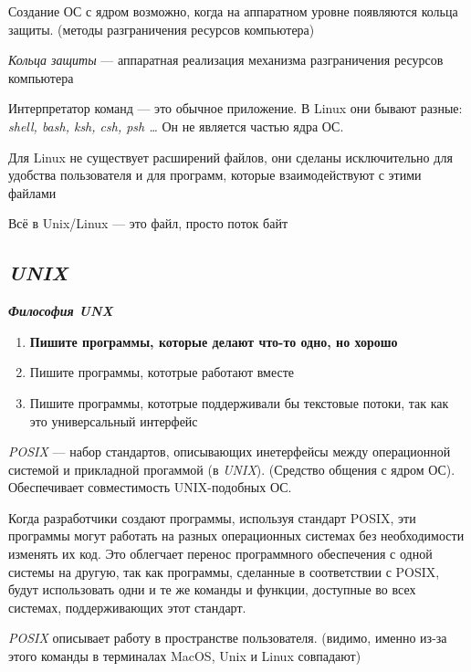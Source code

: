\documentclass[oneside, final, 14pt]{extreport} %
\begin{document}
Создание ОС с ядром возможно, когда на аппаратном уровне появляются
кольца защиты. (методы разграничения ресурсов компьютера)

\textit{Кольца защиты} --- аппаратная реализация механизма
разграничения ресурсов компьютера 


Интерпретатор команд --- это обычное приложение. В Linux
они бывают разные: \textit{shell, bash, ksh, csh, psh \ldots} Он не 
является частью ядра ОС.

Для Linux не существует расширений файлов, они сделаны 
исключительно для удобства пользователя и для программ, которые 
взаимодействуют с этими файлами

Всё в Unix/Linux --- это файл, просто поток байт

\vspace{\baselineskip} %

\subsection{\textit{UNIX}}

\textit{\textbf{Философия UNX}}
\begin{enumerate}
    \item \textbf{Пишите программы, которые делают что-то одно, но хорошо}
    \item Пишите программы, кототрые работают вместе 
    \item Пишите программы, кототрые поддерживали бы текстовые потоки, так как это универсальный интерфейс
\end{enumerate}

\vspace{\baselineskip} %
 
\textit{POSIX} --- набор стандартов, описывающих 
инетерфейсы между операционной системой и 
прикладной прогаммой (в \textit{UNIX}). (Средство общения 
с ядром ОС). Обеспечивает 
совместимость UNIX-подобных ОС.

Когда разработчики создают программы, используя стандарт POSIX, эти программы могут работать на разных операционных системах без необходимости изменять их код. Это облегчает перенос программного обеспечения с одной системы на другую, так как программы, сделанные в соответствии с POSIX, будут использовать одни и те же команды и функции, доступные во всех системах, поддерживающих этот стандарт.

\textit{POSIX} описывает работу в пространстве пользователя. (видимо, 
именно из-за этого команды в терминалах MacOS, Unix и Linux совпадают)
\end{document}

